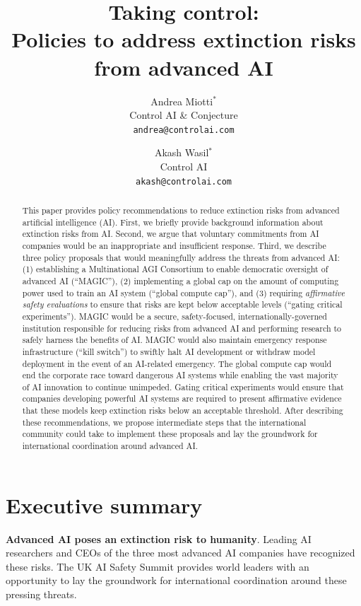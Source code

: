 \documentclass[12pt,a4paper]{article}
\title{Taking control: \\
Policies to address extinction risks from advanced AI}
\author{
  Andrea Miotti$^*$\\
  \small{Control AI \& Conjecture}\\
  \small\texttt{andrea@controlai.com}
  \and 
  Akash Wasil$^*$\\
  \small{Control AI}\\
  \small\texttt{akash@controlai.com}
}\date{}
\begin{document}
\maketitle

\begin{abstract}

\noindent
This paper provides policy recommendations to reduce extinction risks from advanced artificial intelligence (AI). First, we briefly provide background information about extinction risks from AI. Second, we argue that voluntary commitments from AI companies would be an inappropriate and insufficient response. Third, we describe three policy proposals that would meaningfully address the threats from advanced AI: (1) establishing a Multinational AGI Consortium to enable democratic oversight of advanced AI (“MAGIC”), (2) implementing a global cap on the amount of computing power used to train an AI system (“global compute cap”), and (3) requiring \textit{affirmative safety evaluations} to ensure that risks are kept below acceptable levels (“gating critical experiments”). MAGIC would be a secure, safety-focused, internationally-governed institution responsible for reducing risks from advanced AI and performing research to safely harness the benefits of AI. MAGIC would also maintain emergency response infrastructure (“kill switch”) to swiftly halt AI development or withdraw model deployment in the event of an AI-related emergency. The global compute cap would end the corporate race toward dangerous AI systems while enabling the vast majority of AI innovation to continue unimpeded. Gating critical experiments would ensure that companies developing powerful AI systems are required to present affirmative evidence that these models keep extinction risks below an acceptable threshold. After describing these recommendations, we propose intermediate steps that the international community could take to implement these proposals and lay the groundwork for international coordination around advanced AI.

\end{abstract}
\newpage
\section{Executive summary}

\textbf{Advanced AI poses an extinction risk to humanity}. Leading AI researchers and CEOs of the three most advanced AI companies have recognized these risks. The UK AI Safety Summit provides world leaders with an opportunity to lay the groundwork for international coordination around these pressing threats. 
\end{document}
